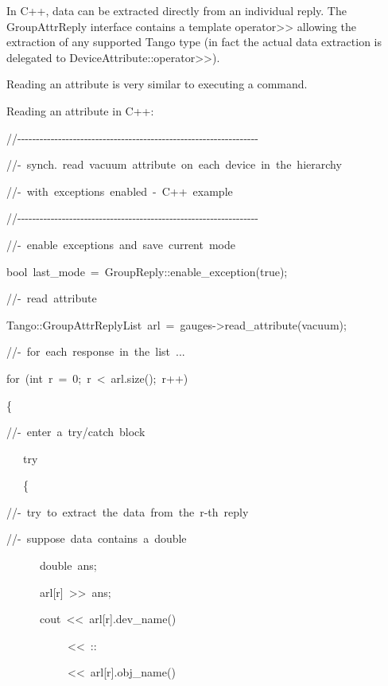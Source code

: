 In C++, data can be extracted directly from an individual reply. The
GroupAttrReply interface contains a template operator>\textcompwordmark{}>
allowing the extraction of any supported Tango type (in fact the actual
data extraction is delegated to DeviceAttribute::operator>\textcompwordmark{}>). 

Reading an attribute is very similar to executing a command. 

Reading an attribute in C++:


\begin{lyxcode}
//-{}-{}-{}-{}-{}-{}-{}-{}-{}-{}-{}-{}-{}-{}-{}-{}-{}-{}-{}-{}-{}-{}-{}-{}-{}-{}-{}-{}-{}-{}-{}-{}-{}-{}-{}-{}-{}-{}-{}-{}-{}-{}-{}-{}-{}-{}-{}-{}-{}-{}-{}-{}-{}-{}-{}-{}-{}-{}-{}-{}-{}-{}-{}-{}-

//-~synch.~read~\textquotedbl{}vacuum\textquotedbl{}~attribute~on~each~device~in~the~hierarchy

//-~with~exceptions~enabled~-~C++~example

//-{}-{}-{}-{}-{}-{}-{}-{}-{}-{}-{}-{}-{}-{}-{}-{}-{}-{}-{}-{}-{}-{}-{}-{}-{}-{}-{}-{}-{}-{}-{}-{}-{}-{}-{}-{}-{}-{}-{}-{}-{}-{}-{}-{}-{}-{}-{}-{}-{}-{}-{}-{}-{}-{}-{}-{}-{}-{}-{}-{}-{}-{}-{}-{}-

//-~enable~exceptions~and~save~current~mode

bool~last\_mode~=~GroupReply::enable\_exception(true);

//-~read~attribute

Tango::GroupAttrReplyList~arl~=~gauges->read\_attribute(\textquotedbl{}vacuum\textquotedbl{});

//-~for~each~response~in~the~list~...

for~(int~r~=~0;~r~<~arl.size();~r++)

\{

//-~enter~a~try/catch~block

~~~try

~~~\{

//-~try~to~extract~the~data~from~the~r-th~reply

//-~suppose~data~contains~a~double

~~~~~~double~ans;

~~~~~~arl{[}r{]}~>\textcompwordmark{}>~ans;

~~~~~~cout~<\textcompwordmark{}<~arl{[}r{]}.dev\_name()

~~~~~~~~~~~<\textcompwordmark{}<~\textquotedbl{}::\textquotedbl{}

~~~~~~~~~~~<\textcompwordmark{}<~arl{[}r{]}.obj\_name()


\end{lyxcode}
